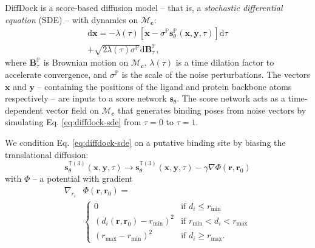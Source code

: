 \documentclass[%
 aip,
 amsmath,amssymb,
 reprint,%
]{revtex4-1}
\begin{document}
DiffDock is a score-based diffusion model\cite{song2020sgm} -- that is, a {\it stochastic differential equation} (SDE) -- with dynamics on $\mathcal{M}_\mathbf{c}$:
\begin{equation}
    \begin{aligned}
    \label{eq:diffdock-sde}
        \mathrm{d}\mathbf{x} = - \lambda(\tau) 
        \left[ \mathbf{x} - \sigma^{\mathbb{P}}\mathbf{s}^\mathbb{P}_\theta(\mathbf{x}, \mathbf{y}, \tau) \right]
        \mathrm{d}\tau \\+ \sqrt{2 \lambda(\tau) \sigma^{\mathbb{P}}}\mathrm{d}\mathbf{B}^{\mathbb{P}}_\tau,
    \end{aligned}
\end{equation}
where $\mathbf{B}_\tau^{\mathbb{P}}$ is Brownian motion on $\mathcal{M}_{\mathbf{c}}$, $\lambda(\tau)$ is a time dilation factor to accelerate convergence, and $\sigma^{\mathbb{P}}$ is the scale of the noise perturbations. The vectors $\mathbf{x}$ and $\mathbf{y}$ -- containing the positions of the ligand and protein backbone atoms respectively -- are inputs to a score network $\mathbf{s}_\theta$. The score network acts as a time-dependent vector field on $\mathcal{M}_{\mathbf{c}}$ that generates binding poses from noise vectors by simulating Eq. \ref{eq:diffdock-sde} from $\tau = 0$ to $\tau = 1$.

We condition Eq. \ref{eq:diffdock-sde} on a putative binding site by biasing the translational diffusion:
\begin{equation}
    \label{eq:diffdock-sde-conditional}
        \mathbf{s}^{\mathbb{T}(3)}_\theta(\mathbf{x}, \mathbf{y}, \tau)\rightarrow \mathbf{s}^{\mathbb{T}(3)}_\theta(\mathbf{x}, \mathbf{y}, \tau) - \gamma \nabla \Phi(\mathbf{r},\mathbf{r}_0)
\end{equation}
with $\Phi$ -- a potential with gradient
\begin{equation}
    \begin{aligned}
    \nabla_{r_i}&\Phi(\mathbf{r}, \mathbf{r}_0) = \\
    &\begin{cases} 
    0 & \text{if } d_i \leq r_{\mathrm{min}} \\
    (d_i(\mathbf{r}, \mathbf{r}_{0}) - r_{\mathrm{min}})^2 & \text{if } r_{\mathrm{min}} < d_i < r_{\mathrm{max}} \\
    (r_{\mathrm{max}} - r_{\mathrm{min}})^2 & \text{if } d_i \geq r_{\mathrm{max}}.
    \end{cases}
    \end{aligned}
\end{equation}
\end{document}
